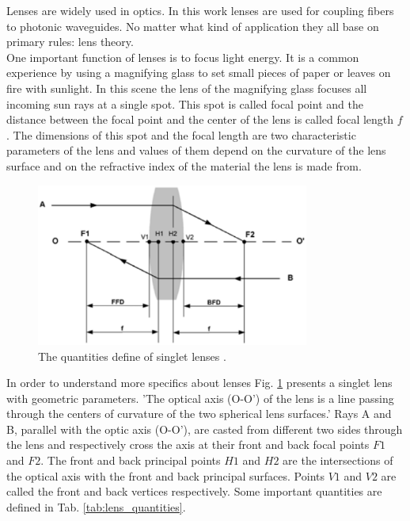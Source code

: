 Lenses are widely used in optics. In this work lenses are used for coupling fibers to photonic waveguides. No matter what kind of application they all base on primary rules: lens theory.\\

One important function of lenses is to focus light energy. It is a common experience by using a magnifying glass to set small pieces of paper or leaves on fire with sunlight. In this scene the lens of the magnifying glass focuses all incoming sun rays at a single spot. This spot is called focal point and the distance between the focal point and the center of the lens is called focal length $f$. The dimensions of this spot and the focal length are two characteristic parameters of the lens and values of them depend on the curvature of the lens surface and on the refractive index of the material the lens is made from. \\

\begin{figure}[!ht]
\centering
\includegraphics[width=0.8\textwidth]{bilder/lens_define}
\caption{The quantities define of singlet lenses \cite{lens_theory_LC_Ltd}.}
\label{fig:lens_define}
\end{figure}
In order to understand more specifics about lenses Fig. \ref{fig:lens_define}  presents a singlet lens with geometric parameters. 'The optical axis (O-O') of the lens is a line passing through the centers of curvature of the two spherical lens surfaces.'  
Rays A and B, parallel with the optic axis (O-O'), are casted from different two sides through the lens and respectively cross the axis at their front and back focal points $F1$ and $F2$. The front and back principal points $H1$ and $H2$ are the intersections of the optical axis with the front and back principal surfaces. Points $V1$ and $V2$ are called the front and back vertices respectively\cite{lens_theory_LC_Ltd}.  Some important quantities are defined in Tab. \ref{tab:lens_quantities}. \\

